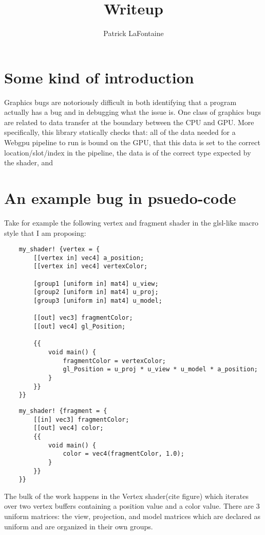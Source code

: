 \documentclass{article}
\begin{document}
\title{Writeup}
\author{Patrick LaFontaine}
\maketitle{}
\section{Some kind of introduction}

    Graphics bugs are notoriously difficult in both identifying that a program actually has a bug and in debugging what the issue is. One class of graphics bugs are related to data transfer at the boundary between the CPU and GPU. More specifically, this library statically checks that: all of the data needed for a Webgpu pipeline to run is bound on the GPU, that this data is set to the correct location/slot/index in the pipeline, the data is of the correct type expected by the shader, and

\section{An example bug in psuedo-code}

    Take for example the following vertex and fragment shader in the glsl-like macro style that I am proposing:
    \begin{lstlisting}
    my_shader! {vertex = {
        [[vertex in] vec4] a_position;
        [[vertex in] vec4] vertexColor;

        [group1 [uniform in] mat4] u_view;
        [group2 [uniform in] mat4] u_proj;
        [group3 [uniform in] mat4] u_model;

        [[out] vec3] fragmentColor;
        [[out] vec4] gl_Position;

        {{
            void main() {
                fragmentColor = vertexColor;
                gl_Position = u_proj * u_view * u_model * a_position;
            }
        }}
    }}
    \end{lstlisting}
    \begin{lstlisting}
    my_shader! {fragment = {
        [[in] vec3] fragmentColor;
        [[out] vec4] color;
        {{
            void main() {
                color = vec4(fragmentColor, 1.0);
            }
        }}
    }}
    \end{lstlisting}

    The bulk of the work happens in the Vertex shader(cite figure) which iterates over two vertex buffers containing a position value and a color value. There are 3 uniform matrices: the view, projection, and model matrices which are declared as uniform and are organized in their own groups.
\end{document}

